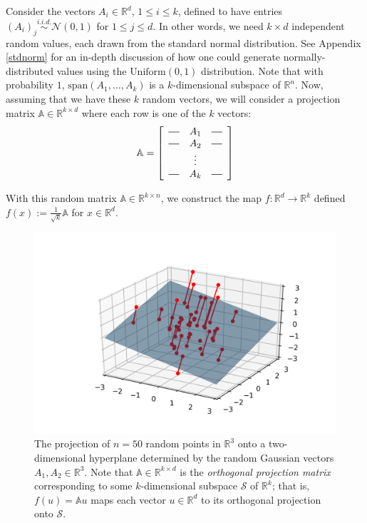 \documentclass{article}
\newcommand*{\horzbar}{\rule[.5ex]{2.5ex}{0.5pt}}
\begin{document}
Consider the vectors $A_i \in \mathbb{R}^d$, $1 \le i \le k$, defined to have entries $(A_i)_j \overset{i.i.d.}{\sim} \mathcal{N}(0, 1)$ for $1 \le j \le d$. In other words, we need $k\times d$ independent random values, each drawn from the standard normal distribution. See Appendix \ref{stdnorm} for an in-depth discussion of how one could generate normally-distributed values using the $\text{Uniform}(0,1)$ distribution. Note that with probability $1$, $\text{span}\left(A_1, \ldots, A_k \right)$ is a $k$-dimensional subspace of $\mathbb{R}^n$. Now, assuming that we have these $k$ random vectors, we will consider a projection matrix $\mathbb{A} \in \mathbb{R}^{k \times d}$ where each row is one of the $k$ vectors:
\begin{align*}
        \mathbb{A} = 
        \left[
            \begin{array}{ccc}
            \horzbar & A_{1} & \horzbar \\
            \horzbar & A_{2} & \horzbar \\
            & \vdots &  \\
            \horzbar & A_{k} & \horzbar
            \end{array}
        \right]
\end{align*}

With this random matrix $\mathbb{A} \in \mathbb{R}^{k \times n}$, we construct the map $f: \mathbb{R}^d \rightarrow \mathbb{R}^k$ defined $f(x) := \frac{1}{\sqrt{k}}\mathbb{A}$ for $x \in \mathbb{R}^d$.

    \begin{figure}[H]
        \centering
        \includegraphics[width=\textwidth]{imgs/random_projections.png}
        \caption{The projection of $n = 50$ random points in $\mathbb{R}^3$ onto a two-dimensional hyperplane determined by the random Gaussian vectors $A_1, A_2 \in \mathbb{R}^3$. Note that $\mathbb{A} \in \mathbb{R}^{k \times d}$ is the \textit{orthogonal projection matrix} corresponding to some $k$-dimensional subspace $\mathcal{S}$ of $\mathbb{R}^k$; that is, $f(u) = \mathbb{A}u$ maps each vector $u \in \mathbb{R}^d$ to its orthogonal projection onto $\mathcal{S}$.}
    \end{figure}
    
\end{document}
